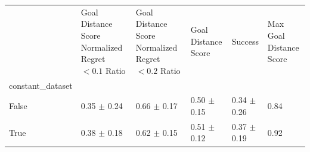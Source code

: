 \begin{tabular}{llllll}
\toprule
 & Goal Distance Score Normalized Regret $< 0.1$ Ratio & Goal Distance Score Normalized Regret $< 0.2$ Ratio & Goal Distance Score & Success & Max Goal Distance Score \\
constant_dataset &  &  &  &  &  \\
\midrule
False & 0.35 $\pm$ 0.24 & 0.66 $\pm$ 0.17 & 0.50 $\pm$ 0.15 & 0.34 $\pm$ 0.26 & 0.84 \\
True & 0.38 $\pm$ 0.18 & 0.62 $\pm$ 0.15 & 0.51 $\pm$ 0.12 & 0.37 $\pm$ 0.19 & 0.92 \\
\bottomrule
\end{tabular}
